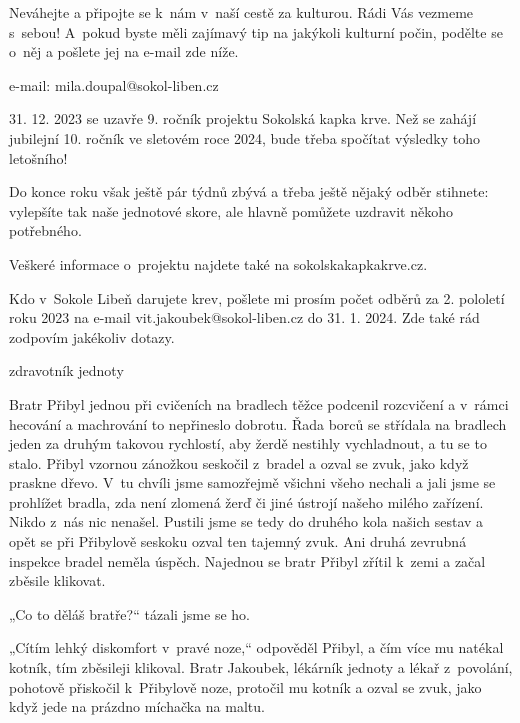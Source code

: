 \documentclass[11pt]{article}
\begin{document}
Neváhejte a připojte se k~nám v~naší cestě za kulturou. Rádi Vás vezmeme s~sebou! A~pokud byste měli zajímavý tip na jakýkoli kulturní počin, podělte se o~něj a pošlete jej na e-mail zde níže.

\signature{Miloslav Doupal}{e-mail: mila.doupal@sokol-liben.cz}

\vspace*{24pt}

31. 12. 2023 se uzavře 9. ročník projektu Sokolská kapka krve. Než se zahájí jubilejní 10. ročník ve sletovém roce 2024, bude třeba spočítat výsledky toho letošního!

Do konce roku však ještě pár týdnů zbývá a třeba ještě nějaký odběr stihnete: vylepšíte tak naše jednotové skore, ale hlavně pomůžete uzdravit někoho potřebného. 

Veškeré informace o~projektu najdete také na sokolskakapkakrve.cz.

Kdo v~Sokole Libeň darujete krev, pošlete mi prosím počet odběrů za 2. pololetí roku 2023 na e-mail vit.jakoubek@sokol-liben.cz do 31. 1. 2024. Zde také rád zodpovím jakékoliv dotazy.

\signature{Vít Jakoubek}{zdravotník jednoty}

\clearpage

Bratr Přibyl jednou při cvičeních na bradlech těžce podcenil rozcvičení a v~rámci hecování a machrování to nepřineslo dobrotu. Řada borců se střídala na bradlech jeden za druhým takovou rychlostí, aby žerdě nestihly vychladnout, a tu se to stalo. Přibyl vzornou zánožkou seskočil z~bradel a ozval se zvuk, jako když praskne dřevo. V~tu chvíli jsme samozřejmě všichni všeho nechali a jali jsme se prohlížet bradla, zda není zlomená žerď či jiné ústrojí našeho milého zařízení. Nikdo z~nás nic nenašel. Pustili jsme se tedy do druhého kola našich sestav a opět se při Přibylově seskoku ozval ten tajemný zvuk. Ani druhá zevrubná inspekce bradel neměla úspěch. Najednou se bratr Přibyl zřítil k~zemi a začal zběsile klikovat.

„Co to děláš bratře?“ tázali jsme se ho.

„Cítím lehký diskomfort v~pravé noze,“ odpověděl Přibyl, a čím více mu natékal kotník, tím zběsileji klikoval. Bratr Jakoubek, lékárník jednoty a lékař z~povolání, pohotově přiskočil k~Přibylově noze, protočil mu kotník a ozval se zvuk, jako když jede na prázdno míchačka na maltu.
\end{document}
